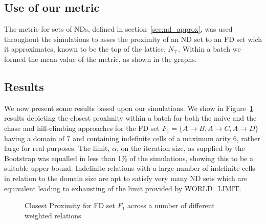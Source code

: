 \subsection{Use of our metric}\label{subsec:cp_metric_use}

The metric for sets of NDs, defined in section~\ref{sec:nd_approx},
was used throughout the simulations to asses the proximity of an ND
set to an FD set wich it approximates, known to be the top of the
lattice, $N_{\top}$. Within a batch we formed the mean value of the
metric, as shown in the graphs.   

\subsection{Results}\label{sol:res}

We now present some results based upon our simulations. We show
in Figure~\ref{graph:4.1} results depicting the closest proximity
within a batch for 
both the naive and the chase and hill-climbing approaches for the
FD set $F_1 = \{A \to B, A \to C, A \to D \}$ having a domain of 7 and 
containing indefinite cells of a maximum arity 6, rather large for
real purposes.  The limit, $\alpha$,  
on the iteration size, as supplied by the Bootstrap was 
equalled in less than 1\% of the simulations, showing this to
be a suitable upper bound. Indefinite relations with a large number of
indefinite cells in relation to the domain size are apt to satisfy
very many ND sets which are equivalent leading to exhausting of the
limit provided by WORLD\_LIMIT.

\begin{figure}
\centerline{}
\caption{\label{graph:4.1} {Closest Proximity for FD set $F_1$ across a number of different weighted relations}}
\end{figure}

\smallskip

